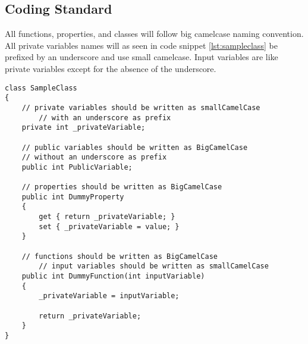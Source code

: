 \subsection{Coding Standard}
\label{subsec:coding_standard}
All functions, properties, and classes will follow big camelcase naming convention.
All private variables names will as seen in code snippet \ref{lst:sampleclass} be prefixed by an underscore and use small camelcase.
Input variables are like private variables except for the absence of the underscore.

\begin{lstlisting}[style=sourceCode, caption=\myCaption{SampleClass.cs}, label=lst:sampleclass]
class SampleClass
{
    // private variables should be written as smallCamelCase
		// with an underscore as prefix
    private int _privateVariable;

    // public variables should be written as BigCamelCase
    // without an underscore as prefix
    public int PublicVariable;

    // properties should be written as BigCamelCase
    public int DummyProperty
    {
        get { return _privateVariable; }
        set { _privateVariable = value; }
    }

    // functions should be written as BigCamelCase
		// input variables should be written as smallCamelCase
    public int DummyFunction(int inputVariable)
    {
        _privateVariable = inputVariable;

        return _privateVariable;
    }
}
\end{lstlisting}